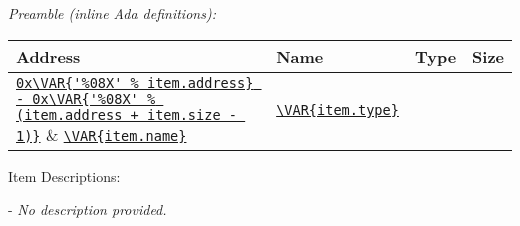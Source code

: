 
\vspace{10mm}
\textit{Preamble (inline Ada definitions):}
\begin{adacode}
\end{adacode}

\begin{xltabular}{\textwidth}{ | X | X | X | c | }
  \hline
  \textbf{Address} & \textbf{Name} & \textbf{Type} & \textbf{Size} \\ \hline
  \texttt{\url{0x\VAR{'%
  \texttt{\url{\VAR{item.name}}} &
  \texttt{\url{\VAR{item.type}}} &
  \texttt{} \\ \hline
\end{xltabular}
\vspace{5mm} %

Item Descriptions:
\begin{spaceditemize}
  \item \textbf{\texttt{}} - 
    \textit{No description provided.}
\end{spaceditemize}
\vspace{5mm} %
